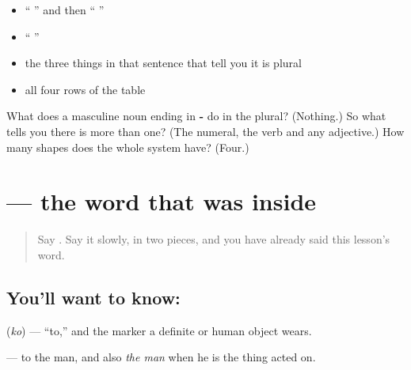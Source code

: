 \begin{itemize}
\raggedright
  \item \textquotedblleft{} \textquotedblright{} and then \textquotedblleft{} \textquotedblright{}
  \item \textquotedblleft{}   \textquotedblright{}
  \item the three things in that sentence that tell you it is plural
  \item all four rows of the table
\end{itemize}

\begin{tcolorbox}[breakable,colback=teal!4,colframe=teal!35!black,title={Before you move on}]
What does a masculine noun ending in \textbf{-} do in the plural? (Nothing.) So what tells you there is more than one? (The numeral, the verb and any adjective.) How many shapes does the whole system have? (Four.)
\end{tcolorbox}
\section[\texorpdfstring{\hi{को} (ko)}{को (ko)}]{ — the word that was inside }

\label{lesson:HI-C91-ko}



\begin{quote}
Say \textbf{}. Say it slowly, in two pieces, and you have already said this lesson's word.
\end{quote}

\subsection*{You'll want to know: }
\textbf{} (\emph{ko}) — \textquotedblleft{}to,\textquotedblright{} and the marker a definite or human object wears.

\textbf{ } — to the man, and also \emph{the man} when he is the thing acted on.

